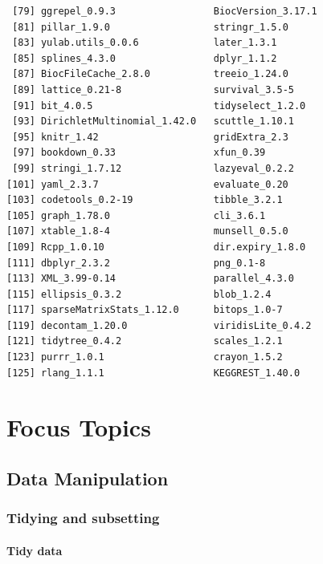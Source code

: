 \documentclass[
]{book}
\begin{document}
\begin{verbatim}
 [79] ggrepel_0.9.3                 BiocVersion_3.17.1           
 [81] pillar_1.9.0                  stringr_1.5.0                
 [83] yulab.utils_0.0.6             later_1.3.1                  
 [85] splines_4.3.0                 dplyr_1.1.2                  
 [87] BiocFileCache_2.8.0           treeio_1.24.0                
 [89] lattice_0.21-8                survival_3.5-5               
 [91] bit_4.0.5                     tidyselect_1.2.0             
 [93] DirichletMultinomial_1.42.0   scuttle_1.10.1               
 [95] knitr_1.42                    gridExtra_2.3                
 [97] bookdown_0.33                 xfun_0.39                    
 [99] stringi_1.7.12                lazyeval_0.2.2               
[101] yaml_2.3.7                    evaluate_0.20                
[103] codetools_0.2-19              tibble_3.2.1                 
[105] graph_1.78.0                  cli_3.6.1                    
[107] xtable_1.8-4                  munsell_0.5.0                
[109] Rcpp_1.0.10                   dir.expiry_1.8.0             
[111] dbplyr_2.3.2                  png_0.1-8                    
[113] XML_3.99-0.14                 parallel_4.3.0               
[115] ellipsis_0.3.2                blob_1.2.4                   
[117] sparseMatrixStats_1.12.0      bitops_1.0-7                 
[119] decontam_1.20.0               viridisLite_0.4.2            
[121] tidytree_0.4.2                scales_1.2.1                 
[123] purrr_1.0.1                   crayon_1.5.2                 
[125] rlang_1.1.1                   KEGGREST_1.40.0              
\end{verbatim}

\hypertarget{part-focus-topics}{%
\part{Focus Topics}\label{part-focus-topics}}

\hypertarget{datamanipulation}{%
\chapter{Data Manipulation}\label{datamanipulation}}

\hypertarget{tidying-and-subsetting}{%
\section{Tidying and subsetting}\label{tidying-and-subsetting}}

\hypertarget{tidy-data}{%
\subsection{Tidy data}\label{tidy-data}}
\end{document}
